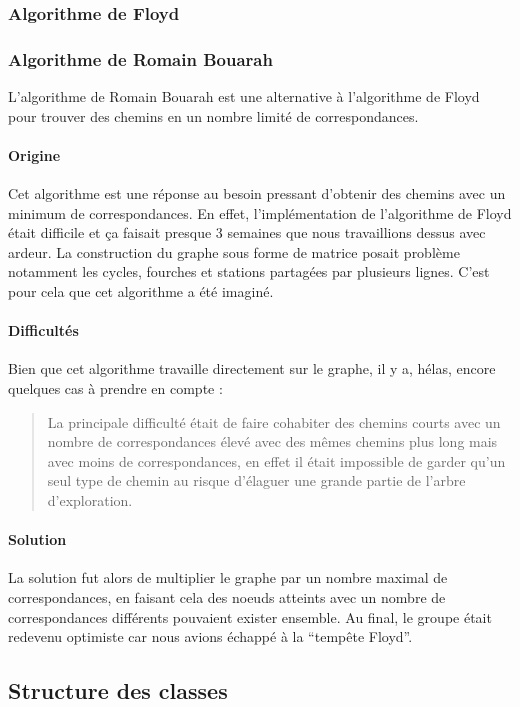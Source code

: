 \documentclass[french, 12pt]{article}
\begin{document}
\subsubsection{Algorithme de Floyd}

\subsubsection{Algorithme de Romain Bouarah}
L'algorithme de Romain Bouarah est une alternative à l'algorithme de Floyd pour trouver des chemins en un nombre limité de correspondances.

\paragraph{Origine}
Cet algorithme est une réponse au besoin pressant d'obtenir des chemins avec un minimum de correspondances.
En effet, l'implémentation de l'algorithme de Floyd était difficile et ça faisait presque 3 semaines que nous travaillions dessus avec ardeur.
La construction du graphe sous forme de matrice posait problème notamment les cycles, fourches et stations partagées par plusieurs lignes.
C'est pour cela que cet algorithme a été imaginé.

\paragraph{Difficultés}
Bien que cet algorithme travaille directement sur le graphe, il y a, hélas, encore quelques cas à prendre en compte :

\begin{quote}  
  La principale difficulté était de faire cohabiter des chemins courts avec un nombre de correspondances élevé avec des mêmes chemins plus long mais avec moins de correspondances, en effet il était impossible de garder qu'un seul type de chemin au risque d'élaguer une grande partie de l'arbre d'exploration.
\end{quote}

\paragraph{Solution}
La solution fut alors de multiplier le graphe par un nombre maximal de correspondances, en faisant cela des noeuds atteints avec un nombre de correspondances différents pouvaient exister ensemble.
Au final, le groupe était redevenu optimiste car nous avions échappé à la ``tempête Floyd''.

\subsection{Structure des classes}
\end{document}
